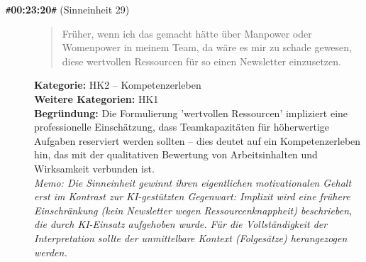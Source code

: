 \begin{description}
  \item[\texttt{\#}\textbf{00:23:20}\texttt{\#} (Sinneinheit 29)]
  \begin{quote}
  Früher, wenn ich das gemacht hätte über Manpower oder Womenpower in meinem Team, da wäre es mir zu schade gewesen, diese wertvollen Ressourcen für so einen Newsletter einzusetzen.
  \end{quote}
  \textbf{Kategorie:} HK2 -- Kompetenzerleben\\
  \textbf{Weitere Kategorien:} HK1\\
  \textbf{Begr\"undung:} Die Formulierung 'wertvollen Ressourcen' impliziert eine professionelle Einschätzung, dass Teamkapazitäten für höherwertige Aufgaben reserviert werden sollten – dies deutet auf ein Kompetenzerleben hin, das mit der qualitativen Bewertung von Arbeitsinhalten und Wirksamkeit verbunden ist.
  \\\textit{Memo: Die Sinneinheit gewinnt ihren eigentlichen motivationalen Gehalt erst im Kontrast zur KI-gestützten Gegenwart: Implizit wird eine frühere Einschränkung (kein Newsletter wegen Ressourcenknappheit) beschrieben, die durch KI-Einsatz aufgehoben wurde. Für die Vollständigkeit der Interpretation sollte der unmittelbare Kontext (Folgesätze) herangezogen werden.}
\end{description}
\medskip


